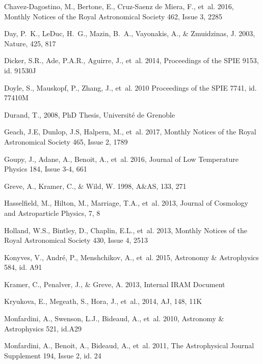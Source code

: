 \begin{thebibliography}{99}
Chavez-Dagostino, M., Bertone, E., Cruz-Saenz de Miera, F., {et~al.} 2016, 
Monthly Notices of the Royal Astronomical Society 462, Issue 3, 2285

Day, P.~K., LeDuc, H.~G., Mazin, B.~A., Vayonakis, A., \& Zmuidzinas, J. 2003,
Nature, 425, 817

Dicker, S.R., Ade, P.A.R., Aguirre, J., {et~al.} 2014,
Proceedings of the SPIE 9153, id. 91530J 

Doyle, S., Mauskopf, P., Zhang, J., {et~al.} 2010
Proceedings of the SPIE 7741, id. 77410M

Durand, T., 2008, 
PhD Thesis, Universit\' e de Grenoble

Geach, J.E, Dunlop, J.S, Halpern, M., {et~al.} 2017, 
Monthly Notices of the Royal Astronomical Society 465, Issue 2, 1789

Goupy, J., Adane, A., Benoit, A., {et~al.} 2016, 
Journal of Low Temperature Physics 184, Issue 3-4, 661

Greve, A., Kramer, C., \& Wild, W. 1998, 
A\&AS, 133, 271

Hasselfield, M., Hilton, M., Marriage, T.A., {et~al.} 2013, 
Journal of Cosmology and Astroparticle Physics, 7, 8

Holland, W.S., Bintley, D., Chaplin, E.L., {et~al.} 2013, 
Monthly Notices of the Royal Astronomical Society 430, Issue 4, 2513

Konyves, V., Andr\'e, P., Menshchikov, A., {et~al.} 2015, 
Astronomy \& Astrophysics 584, id. A91

Kramer, C., Penalver, J., \& Greve, A. 2013, Internal IRAM Document

Kryukova, E., Megeath, S.,  Hora, J., {et~al.}, 2014, AJ, 148, 11K
	
Monfardini, A., Swenson, L.J., Bideaud, A., {et~al.} 2010, 
Astronomy \& Astrophysics 521, id.A29

Monfardini, A., Benoit, A., Bideaud, A., {et~al.} 2011, 
The Astrophysical Journal Supplement 194, Issue 2, id. 24
 

\end{thebibliography}

